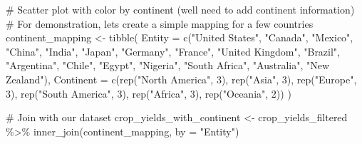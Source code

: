 \documentclass[
  letterpaper,
]{book}
\newenvironment{Shaded}{\begin{snugshade}}{\end{snugshade}}
\newcommand{\AttributeTok}[1]{\textcolor[rgb]{0.40,0.45,0.13}{#1}}
\newcommand{\CommentTok}[1]{\textcolor[rgb]{0.37,0.37,0.37}{#1}}
\newcommand{\DecValTok}[1]{\textcolor[rgb]{0.68,0.00,0.00}{#1}}
\newcommand{\FunctionTok}[1]{\textcolor[rgb]{0.28,0.35,0.67}{#1}}
\newcommand{\NormalTok}[1]{\textcolor[rgb]{0.00,0.23,0.31}{#1}}
\newcommand{\OtherTok}[1]{\textcolor[rgb]{0.00,0.23,0.31}{#1}}
\newcommand{\SpecialCharTok}[1]{\textcolor[rgb]{0.37,0.37,0.37}{#1}}
\newcommand{\StringTok}[1]{\textcolor[rgb]{0.13,0.47,0.30}{#1}}
\begin{document}
\begin{Shaded}
\begin{Highlighting}[]
\CommentTok{\# Scatter plot with color by continent (we\textquotesingle{}ll need to add continent information)}
\CommentTok{\# For demonstration, let\textquotesingle{}s create a simple mapping for a few countries}
\NormalTok{continent\_mapping }\OtherTok{\textless{}{-}} \FunctionTok{tibble}\NormalTok{(}
  \AttributeTok{Entity =} \FunctionTok{c}\NormalTok{(}\StringTok{"United States"}\NormalTok{, }\StringTok{"Canada"}\NormalTok{, }\StringTok{"Mexico"}\NormalTok{, }
             \StringTok{"China"}\NormalTok{, }\StringTok{"India"}\NormalTok{, }\StringTok{"Japan"}\NormalTok{, }
             \StringTok{"Germany"}\NormalTok{, }\StringTok{"France"}\NormalTok{, }\StringTok{"United Kingdom"}\NormalTok{, }
             \StringTok{"Brazil"}\NormalTok{, }\StringTok{"Argentina"}\NormalTok{, }\StringTok{"Chile"}\NormalTok{,}
             \StringTok{"Egypt"}\NormalTok{, }\StringTok{"Nigeria"}\NormalTok{, }\StringTok{"South Africa"}\NormalTok{,}
             \StringTok{"Australia"}\NormalTok{, }\StringTok{"New Zealand"}\NormalTok{),}
  \AttributeTok{Continent =} \FunctionTok{c}\NormalTok{(}\FunctionTok{rep}\NormalTok{(}\StringTok{"North America"}\NormalTok{, }\DecValTok{3}\NormalTok{), }
                \FunctionTok{rep}\NormalTok{(}\StringTok{"Asia"}\NormalTok{, }\DecValTok{3}\NormalTok{), }
                \FunctionTok{rep}\NormalTok{(}\StringTok{"Europe"}\NormalTok{, }\DecValTok{3}\NormalTok{), }
                \FunctionTok{rep}\NormalTok{(}\StringTok{"South America"}\NormalTok{, }\DecValTok{3}\NormalTok{),}
                \FunctionTok{rep}\NormalTok{(}\StringTok{"Africa"}\NormalTok{, }\DecValTok{3}\NormalTok{),}
                \FunctionTok{rep}\NormalTok{(}\StringTok{"Oceania"}\NormalTok{, }\DecValTok{2}\NormalTok{))}
\NormalTok{)}

\CommentTok{\# Join with our dataset}
\NormalTok{crop\_yields\_with\_continent }\OtherTok{\textless{}{-}}\NormalTok{ crop\_yields\_filtered }\SpecialCharTok{\%\textgreater{}\%}
  \FunctionTok{inner\_join}\NormalTok{(continent\_mapping, }\AttributeTok{by =} \StringTok{"Entity"}\NormalTok{)}


\end{Highlighting}
\end{Shaded}
\end{document}

